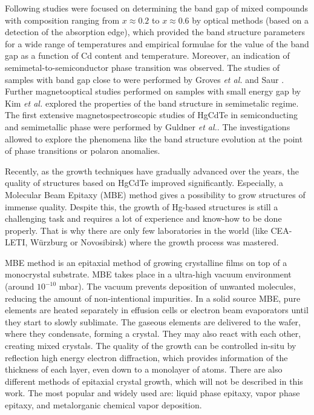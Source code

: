 \documentclass[titlepage,a4paper]{book}
\begin{document}
Following studies were focused on determining the band gap of mixed compounds with composition ranging from $x \approx 0.2$ to $x \approx 0.6$ by optical methods \cite{Schmit_MCT_bulk}\cite{Scott_MCT_bulk} (based on a detection of the absorption edge), which provided the band structure parameters for a wide range of temperatures and empirical formulae for the value of the band gap as a function of Cd content and temperature. Moreover, an indication of semimetal-to-semiconductor phase transition was observed. The studies of samples with band gap close to were performed by Groves \textit{et al.} \cite{Groves_MCT_bulk} and Saur \cite{Saur_MCT_bulk}. Further magnetooptical studies performed on samples with small energy gap by Kim \textit{et al.} \cite{Kim_MCT_bulk} explored the properties of the band structure in semimetalic regime. The first extensive magnetospectroscopic studies of HgCdTe in semiconducting \cite{Guldner_MCT_bulk1} and semimetallic \cite{Guldner_MCT_bulk2} phase were performed by Guldner \textit{et al.}. The investigations allowed to explore the phenomena like the band structure evolution at the point of phase transitions or polaron anomalies.

Recently, as the growth techniques have gradually advanced over the years, the quality of structures based on HgCdTe improved significantly. Especially, a Molecular Beam Epitaxy (MBE) method gives a possibility to grow structures of immense quality. Despite this, the growth of Hg-based structures is still a challenging task and requires a lot of experience and know-how to be done properly. That is why there are only few laboratories in the world (like CEA-LETI, Würzburg or Novosibirsk) where the growth process was mastered.

MBE method is an epitaxial method of growing crystalline films on top of a monocrystal substrate. MBE takes place in a ultra-high vacuum environment (around $10^{-10}$ mbar). The vacuum prevents deposition of unwanted molecules, reducing the amount of non-intentional impurities. In a solid source MBE, pure elements are heated separately in effusion cells or electron beam evaporators until they start to slowly sublimate. The gaseous elements are delivered to the wafer, where they condensate, forming a crystal. They may also react with each other, creating mixed crystals. The quality of the growth can be controlled in-situ by reflection high energy electron diffraction, which provides information of the thickness of each layer, even down to a monolayer of atoms. There are also different methods of epitaxial crystal growth, which will not be described in this work. The most popular and widely used are: liquid phase epitaxy, vapor phase epitaxy, and metalorganic chemical vapor deposition.
\end{document}
